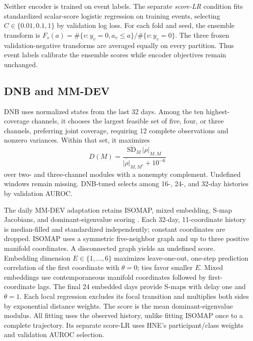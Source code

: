 Neither encoder is trained on event labels. The separate \emph{score-LR} condition fits standardized scalar-score logistic regression on training events, selecting $C\in\{0.01,0.1,1\}$ by validation log loss. For each fold and seed, the ensemble transform is $F_s(a)=\#\{v:y_v=0,a_v\leq a\}/\#\{v:y_v=0\}$. The three frozen validation-negative transforms are averaged equally on every partition. Thus event labels calibrate the ensemble scores while encoder objectives remain unchanged.

\subsection{DNB and MM-DEV}
DNB uses normalized states from the last 32 days. Among the ten highest-coverage channels, it chooses the largest feasible set of five, four, or three channels, preferring joint coverage, requiring 12 complete observations and nonzero variances. Within that set, it maximizes
\begin{equation}
 D(M)=\frac{\overline{\mathrm{SD}}_M\,
 \overline{|\rho|}_{M,M}}{\overline{|\rho|}_{M,M^c}+10^{-6}}
\end{equation}
over two- and three-channel modules with a nonempty complement. Undefined windows remain missing. DNB-tuned selects among 16-, 24-, and 32-day histories by validation AUROC.

The daily MM-DEV adaptation retains ISOMAP, mixed embedding, S-map Jacobians, and dominant-eigenvalue scoring \citep{hneM10}. Each 32-day, 11-coordinate history is median-filled and standardized independently; constant coordinates are dropped. ISOMAP uses a symmetric five-neighbor graph and up to three positive manifold coordinates. A disconnected graph yields an undefined score. Embedding dimension $E\in\{1,\ldots,6\}$ maximizes leave-one-out, one-step prediction correlation of the first coordinate with $\theta=0$; ties favor smaller $E$. Mixed embeddings use contemporaneous manifold coordinates followed by first-coordinate lags. The final 24 embedded days provide S-maps with delay one and $\theta=1$. Each local regression excludes its focal transition and multiplies both sides by exponential distance weights. The score is the mean dominant-eigenvalue modulus. All fitting uses the observed history, unlike fitting ISOMAP once to a complete trajectory. Its separate score-LR uses HNE's participant/class weights and validation AUROC selection.

